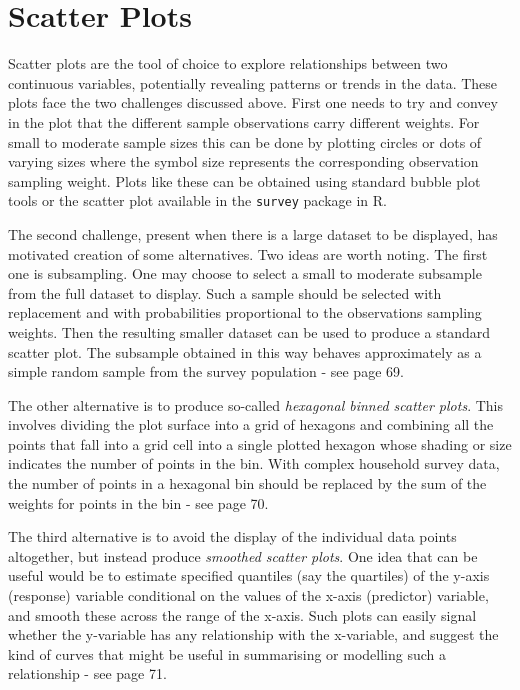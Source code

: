 \documentclass[
  12pt,
]{book}
\begin{document}
\hypertarget{scatter-plots}{%
\section{Scatter Plots}\label{scatter-plots}}

Scatter plots are the tool of choice to explore relationships between two continuous variables, potentially revealing patterns or trends in the data. These plots face the two challenges discussed above. First one needs to try and convey in the plot that the different sample observations carry different weights. For small to moderate sample sizes this can be done by plotting circles or dots of varying sizes where the symbol size represents the corresponding observation sampling weight. Plots like these can be obtained using standard bubble plot tools or the scatter plot available in the \texttt{survey} package in R.

The second challenge, present when there is a large dataset to be displayed, has motivated creation of some alternatives. Two ideas are worth noting. The first one is subsampling. One may choose to select a small to moderate subsample from the full dataset to display. Such a sample should be selected with replacement and with probabilities proportional to the observations sampling weights. Then the resulting smaller dataset can be used to produce a standard scatter plot. The subsample obtained in this way behaves approximately as a simple random sample from the survey population - see \citet{Lumley2010} page 69.

The other alternative is to produce so-called \emph{hexagonal binned scatter plots}. This involves dividing the plot surface into a grid of hexagons and combining all the points that fall into a grid cell into a single plotted hexagon whose shading or size indicates the number of points in the bin. With complex household survey data, the number of points in a hexagonal bin should be replaced by the sum of the weights for points in the bin - see \citet{Lumley2010} page 70.

The third alternative is to avoid the display of the individual data points altogether, but instead produce \emph{smoothed scatter plots}. One idea that can be useful would be to estimate specified quantiles (say the quartiles) of the y-axis (response) variable conditional on the values of the x-axis (predictor) variable, and smooth these across the range of the x-axis. Such plots can easily signal whether the y-variable has any relationship with the x-variable, and suggest the kind of curves that might be useful in summarising or modelling such a relationship - see \citet{Lumley2010} page 71.
\end{document}
